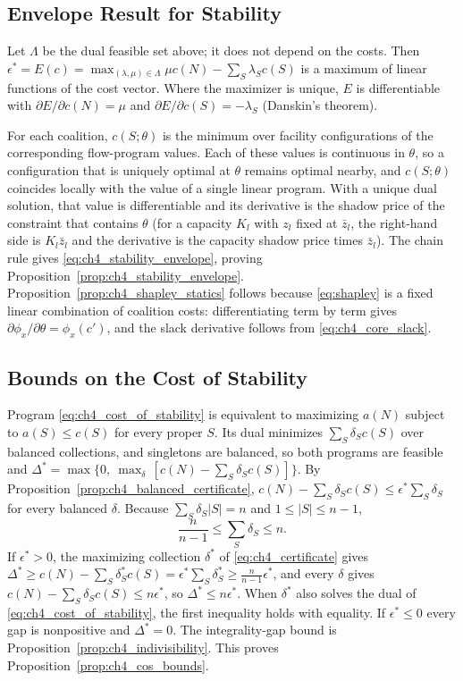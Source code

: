\subsection{Envelope Result for Stability}

Let $\Lambda$ be the dual feasible set above; it does not depend on the costs.
Then $\epsilon^*=E(c)=\max_{(\lambda,\mu)\in\Lambda}\mu c(N)-\sum_S\lambda_Sc(S)$
is a maximum of linear functions of the cost vector. Where the maximizer is
unique, $E$ is differentiable with $\partial E/\partial c(N)=\mu$ and
$\partial E/\partial c(S)=-\lambda_S$ (Danskin's theorem).

For each coalition, $c(S;\theta)$ is the minimum over facility configurations
of the corresponding flow-program values. Each of these values is continuous in
$\theta$, so a configuration that is uniquely optimal at $\theta$ remains
optimal nearby, and $c(S;\theta)$ coincides locally with the value of a single
linear program. With a unique dual solution, that value is differentiable and
its derivative is the shadow price of the constraint that contains $\theta$
(for a capacity $K_l$ with $z_l$ fixed at $\bar z_l$, the right-hand side is
$K_l\bar z_l$ and the derivative is the capacity shadow price times $\bar z_l$).
The chain rule gives \eqref{eq:ch4_stability_envelope}, proving
Proposition~\ref{prop:ch4_stability_envelope}. Proposition~\ref{prop:ch4_shapley_statics}
follows because \eqref{eq:shapley} is a fixed linear combination of coalition
costs: differentiating term by term gives $\partial\phi_x/\partial\theta=\phi_x(c')$,
and the slack derivative follows from \eqref{eq:ch4_core_slack}.

\subsection{Bounds on the Cost of Stability}

Program \eqref{eq:ch4_cost_of_stability} is equivalent to maximizing $a(N)$
subject to $a(S)\leq c(S)$ for every proper $S$. Its dual minimizes
$\sum_S\delta_Sc(S)$ over balanced collections, and singletons are balanced, so
both programs are feasible and
$\Delta^*=\max\{0,\ \max_{\delta}\,[c(N)-\sum_S\delta_Sc(S)]\}$. By
Proposition~\ref{prop:ch4_balanced_certificate},
$c(N)-\sum_S\delta_Sc(S)\leq\epsilon^*\sum_S\delta_S$ for every balanced
$\delta$. Because $\sum_S\delta_S|S|=n$ and $1\leq|S|\leq n-1$,
\begin{equation*}
\frac{n}{n-1}\leq\sum_S\delta_S\leq n .
\end{equation*}
If $\epsilon^*>0$, the maximizing collection $\delta^*$ of
\eqref{eq:ch4_certificate} gives
$\Delta^*\geq c(N)-\sum_S\delta^*_Sc(S)=\epsilon^*\sum_S\delta^*_S\geq
\tfrac{n}{n-1}\epsilon^*$, and every $\delta$ gives
$c(N)-\sum_S\delta_Sc(S)\leq n\epsilon^*$, so $\Delta^*\leq n\epsilon^*$. When
$\delta^*$ also solves the dual of \eqref{eq:ch4_cost_of_stability}, the first
inequality holds with equality. If $\epsilon^*\leq0$ every gap is nonpositive
and $\Delta^*=0$. The integrality-gap bound is
Proposition~\ref{prop:ch4_indivisibility}. This proves
Proposition~\ref{prop:ch4_cos_bounds}.

